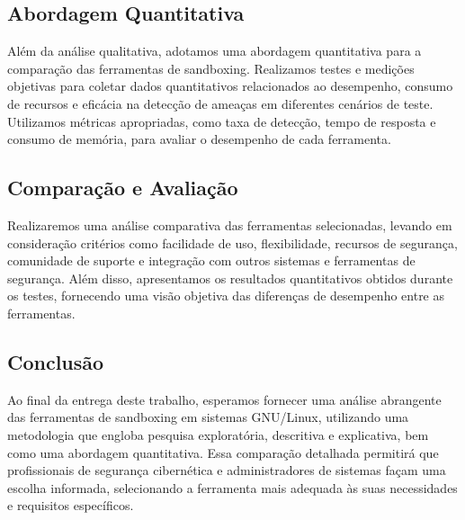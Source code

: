 \subsection{Abordagem Quantitativa}
Além da análise qualitativa, adotamos uma abordagem quantitativa para a comparação das ferramentas de sandboxing. Realizamos testes e medições objetivas para coletar dados quantitativos relacionados ao desempenho, consumo de recursos e eficácia na detecção de ameaças em diferentes cenários de teste. Utilizamos métricas apropriadas, como taxa de detecção, tempo de resposta e consumo de memória, para avaliar o desempenho de cada ferramenta.

\subsection{Comparação e Avaliação}
 Realizaremos uma análise comparativa das ferramentas selecionadas, levando em consideração critérios como facilidade de uso, flexibilidade, recursos de segurança, comunidade de suporte e integração com outros sistemas e ferramentas de segurança. Além disso, apresentamos os resultados quantitativos obtidos durante os testes, fornecendo uma visão objetiva das diferenças de desempenho entre as ferramentas.

\subsection{Conclusão}
Ao final da entrega deste trabalho, esperamos fornecer uma análise abrangente das ferramentas de sandboxing em sistemas GNU/Linux, utilizando uma metodologia que engloba pesquisa exploratória, descritiva e explicativa, bem como uma abordagem quantitativa. Essa comparação detalhada permitirá que profissionais de segurança cibernética e administradores de sistemas façam uma escolha informada, selecionando a ferramenta mais adequada às suas necessidades e requisitos específicos.